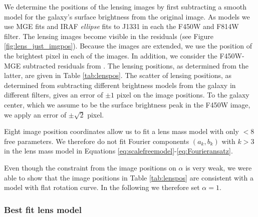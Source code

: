 \documentclass[useAMS,usenatbib]{mnras}
\begin{document}
We determine the positions of the lensing images by first subtracting a smooth model for the galaxy's surface brightness from the original image. As models we use MGE fits and IRAF \emph{ellipse} fits to J1331 in each the F450W and F814W filter. The lensing images become visible in the residuals (see Figure \ref{fig:lens_just_imgpos}). Because the images are extended, we use the position of the brightest pixel in each of the images. In addition, we consider the F450W-MGE subtracted residuals from \citet{SWELLSIII}. The lensing positions, as determined from the latter, are given in Table \ref{tab:lenspos}. The scatter of lensing positions, as determined from subtracting different brightness models from the galaxy in different filters, gives an error of $\pm 1$ pixel on the image positions. To the galaxy center, which we assume to be the surface brightness peak in the F450W image, we apply an error of $\pm \sqrt{2}$ pixel.

Eight image position coordinates allow us to fit a lens mass model with only $<8$ free parameters. We therefore do not fit Fourier components $(a_k,b_k)$ with $k > 3$ in the lens mass model in Equations \eqref{eq:scalefreemodel}-\eqref{eq:Fourieransatz}.

Even though the constraint from the image positions on $\alpha$ is very weak, we were able to show that the image positions in Table \ref{tab:lenspos} are consistent with a model with flat rotation curve. In the following we therefore set $\alpha=1$.

\subsubsection{Best fit lens model} \label{sec:results_lensing_bestfit}
\end{document}
